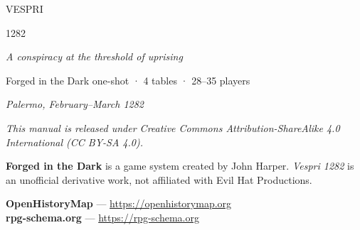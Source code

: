 \documentclass[12pt, twoside, openright]{memoir}
\begin{document}
\begin{titlingpage}
  \vspace*{2cm}
  \begin{center}
    \textcolor{oro}{}
    \hspace{12pt}
    \textcolor{oro}{}
    \vspace{1cm}

    {\cinzeldeco\fontsize{52}{56}\selectfont\color{oro} VESPRI}

    \vspace{0.3cm}
    \filettodoppio

    {\cinzel\fontsize{28}{32}\selectfont\color{grigionote} 1282}

    \filettodoppio
    \vspace{0.5cm}

    {\itshape\large\color{grigionote}
      A conspiracy at the threshold of uprising}

    \vspace{1.2cm}
    \textcolor{oro!50}{}

    \vspace{1.2cm}
    {\cinzel\small\color{grigionote}
      Forged in the Dark one-shot · 4 tables · 28--35 players}

    \vfill
    {\cinzel\footnotesize\color{oro!60}
      \textit{Palermo, February--March 1282}}
  \end{center}
\end{titlingpage}

\cleardoublepage
\thispagestyle{empty}
\vspace*{\fill}
\begin{center}
  \textcolor{oro}{}
\end{center}
\vspace{1cm}
{\small\color{grigionote}
\noindent\textit{This manual is released under Creative Commons
Attribution-ShareAlike 4.0 International (CC BY-SA 4.0).}

\medskip
\noindent\textbf{Forged in the Dark} is a game system created by
John Harper. \textit{Vespri 1282} is an unofficial derivative work,
not affiliated with Evil Hat Productions.

\medskip
\noindent\textbf{OpenHistoryMap} --- \url{https://openhistorymap.org}\\
\textbf{rpg-schema.org} --- \url{https://rpg-schema.org}
}
\vspace*{\fill}
\end{document}
